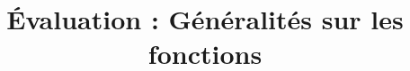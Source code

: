 \documentclass[
	classe=1 STI2D,
]{évaluation}
\title{Évaluation : Généralités sur les fonctions}
\author{}
\date{}
\begin{document}
\maketitle

\begin{exercice}


\end{exercice}
\end{document}
